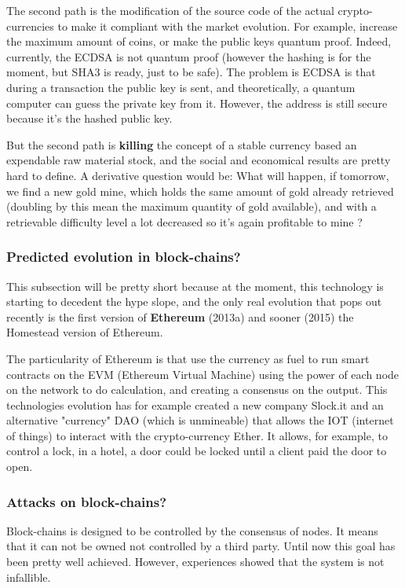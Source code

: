 The second path is the modification of the source code of the actual crypto-currencies to make it compliant with the market evolution. For example, increase the maximum amount of coins, or make the public keys quantum proof. Indeed, currently, the ECDSA is not quantum proof (however the hashing is for the moment, but SHA3 is ready, just to be safe). The problem is ECDSA is that during a transaction the public key is sent, and theoretically, a quantum computer can guess the private key from it. However, the address is still secure because it's the hashed public key.

But the second path is \textbf{killing} the concept of a stable currency based an expendable raw material stock, and the social and economical results are pretty hard to define. A derivative question would be: What will happen, if tomorrow, we find a new gold mine, which holds the same amount of gold already retrieved (doubling by this mean the maximum quantity of gold available), and with a retrievable difficulty level a lot decreased so it's again profitable to mine ?

\subsubsection{Predicted evolution in block-chains?}
This subsection will be pretty short because at the moment, this technology is starting to decedent the hype slope, and the only real evolution that pops out recently is the first version of  \textbf{Ethereum}\cite{VitalikButerin2013APlatform} (2013a) and sooner (2015) the Homestead version of Ethereum\cite{DR.GAVINWOOD2015ETHEREUM:DRAFT}.

The particularity of Ethereum is that use the currency as fuel to run smart contracts on the EVM (Ethereum Virtual Machine) using the power of each node on the network to do calculation, and creating a consensus on the output. This technologies evolution has for example created a new company Slock.it and an alternative "currency" DAO (which is unmineable) that allows the IOT (internet of things) to interact with the crypto-currency Ether. It allows, for example, to control a lock, in a hotel, a door could be locked until a client paid the door to open.

\subsubsection{Attacks on block-chains?}
Block-chains is designed to be controlled by the consensus of nodes. It means that it can not be owned not controlled by a third party. Until now this goal has been pretty well achieved. However, experiences showed that the system is not infallible.

